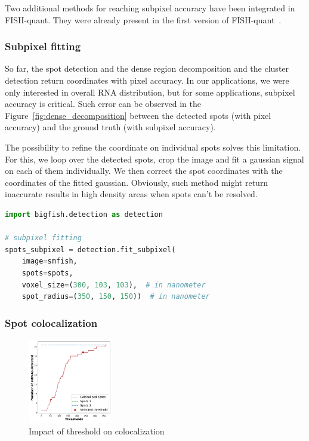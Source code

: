 Two additional methods for reaching subpixel accuracy have been integrated in FISH-quant.
They were already present in the first version of FISH-quant~\cite{mueller_fish-quant_2013}.

\subsubsection{Subpixel fitting}

So far, the spot detection and the dense region decomposition and the cluster detection return coordinates with pixel accuracy.
In our applications, we were only interested in overall \ac{RNA} distribution, but for some applications, subpixel accuracy is critical.
Such error can be observed in the Figure~\ref{fig:dense_decomposition} between the detected spots (with pixel accuracy) and the ground truth (with subpixel accuracy).

The possibility to refine the coordinate on individual spots solves this limitation.
For this, we loop over the detected spots, crop the image and fit a gaussian signal on each of them individually.
We then correct the spot coordinates with the coordinates of the fitted gaussian.
Obviously, such method might return inaccurate results in high density areas when spots can't be resolved.\\

\begin{minipage}{0.9\textwidth}
\begin{lstlisting}[language=Python]
import bigfish.detection as detection

# subpixel fitting
spots_subpixel = detection.fit_subpixel(
    image=smfish,
    spots=spots,
    voxel_size=(300, 103, 103),  # in nanometer
    spot_radius=(350, 150, 150))  # in nanometer
\end{lstlisting}
\end{minipage}

\subsubsection{Spot colocalization}

\begin{figure}
	\begin{center}
		\includegraphics[width=0.33\textwidth]{figures/chapter2/colocalization_elbow}
	\caption[Impact of threshold on colocalization]{Impact of threshold on colocalization}
	\label{fig:elbow_colocalization}
	\end{center}
\end{figure}

